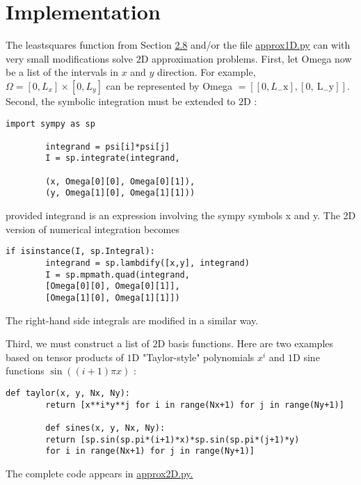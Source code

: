 \documentclass[../main.tex]{subfiles}
\begin{document}
	\section[Implementation]{Implementation}
	\label{sec:sec_8_3}
	\noindent The least\textunderscore squares function from Section \hyperref[sec:sec_2_8]{2.8} and/or the file \href{https://github.com/hplgit/INF5620/blob/master/src/fem/fe_approx1D.py}{approx1D.py} can with very small modifications solve $2 \mathrm{D}$ approximation problems. First, let Omega now be a list of the intervals in $x$ and $y$ direction. For example, $\Omega=\left[0, L_{x}\right] \times\left[0, L_{y}\right]$ can be represented by Omega $=\left[\left[0, L_{-} \mathrm{x}\right],\left[0, \mathrm{~L}_{-} \mathrm{y}\right]\right]$. Second, the symbolic integration must be extended to $2 \mathrm{D}$ :
	\begin{lstlisting}[numbers=none]
		import sympy as sp
		
		integrand = psi[i]*psi[j]
		I = sp.integrate(integrand,
		
		(x, Omega[0][0], Omega[0][1]),
		(y, Omega[1][0], Omega[1][1]))	
	\end{lstlisting}
	provided integrand is an expression involving the sympy symbols x and y. The
	2D version of numerical integration becomes
	\begin{lstlisting}[numbers=none]
		if isinstance(I, sp.Integral):
		integrand = sp.lambdify([x,y], integrand)
		I = sp.mpmath.quad(integrand,
		[Omega[0][0], Omega[0][1]],
		[Omega[1][0], Omega[1][1]])	
	\end{lstlisting}
	The right-hand side integrals are modified in a similar way.
	
	Third, we must construct a list of $2 \mathrm{D}$ basis functions. Here are two examples based on tensor products of $1 \mathrm{D}$ "Taylor-style" polynomials $x^{i}$ and $1 \mathrm{D}$ sine functions $\sin ((i+1) \pi x)$ :
	\begin{lstlisting}[numbers=none]
		def taylor(x, y, Nx, Ny):
		return [x**i*y**j for i in range(Nx+1) for j in range(Ny+1)]
		
		def sines(x, y, Nx, Ny):
		return [sp.sin(sp.pi*(i+1)*x)*sp.sin(sp.pi*(j+1)*y)
		for i in range(Nx+1) for j in range(Ny+1)]	
	\end{lstlisting}
	The complete code appears in \href{http://tinyurl.com/jvzzcfn/fem/fe_approx2D.py}{approx2D.py.}
	
\end{document}
